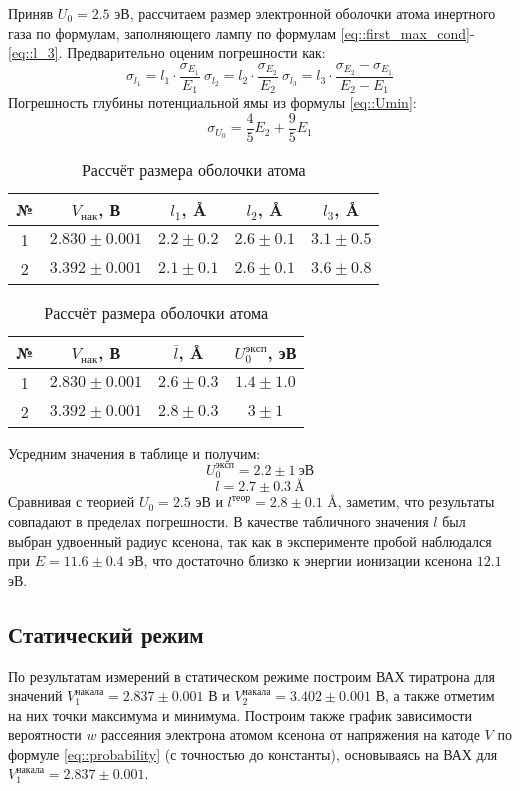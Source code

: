 Приняв $U_0 = 2.5$ эВ, рассчитаем размер электронной оболочки атома инертного
газа по формулам, заполняющего лампу по формулам
\eqref{eq::first_max_cond}-\eqref{eq::l_3}. Предварительно оценим погрешности
как:
\[
  \sigma_{l_1} = l_1 \cdot \frac{\sigma_{E_1}}{E_1} 
  \: 
  \sigma_{l_2} = l_2 \cdot \frac{\sigma_{E_2}}{E_2}
  \: 
  \sigma_{l_3} = l_3 \cdot \frac{\sigma_{E_2} - \sigma_{E_1}}{E_2 - E_1}
\]
Погрешность глубины потенциальной ямы из формулы \eqref{eq::Umin}:
\[
  \sigma_{U_0} = \frac{4}{5} E_2 + \frac{9}{5} E_1
\]
\begin{table}[h!]
  \centering
  \caption{Рассчёт размера оболочки атома}
  \begin{tabular}{|c|c|c|c|c|}
    \hline
    № & $V_{нак}$, В & $l_1$, \AA & $l_2$, \AA & $l_3$, \AA \\ 
    \hline
    1 & $2.830 \pm 0.001$ & $2.2 \pm 0.2$ & $ 2.6 \pm 0.1$ & $3.1 \pm 0.5$ \\ \hline
    2 & $3.392 \pm 0.001$ & $2.1 \pm 0.1$ & $ 2.6 \pm 0.1$ & $ 3.6 \pm 0.8$ \\ 
    \hline
  \end{tabular}
  \begin{tabular}{|c|c|c|c|}
    \hline
    № & $V_{нак}$, В & $\overline{l}$, \AA & $U_0^{эксп}$, эВ\\
    \hline
    1 & $2.830 \pm 0.001$ & $2.6 \pm 0.3$ & $ 1.4 \pm 1.0$\\\hline
    2 & $3.392 \pm 0.001$ & $2.8 \pm 0.3$ & $ 3 \pm 1$\\
    \hline
  \end{tabular}
\end{table}
Усредним значения в таблице и получим:
\[
  U_0^{эксп} = 2.2 \pm 1 \: \text{эВ}
\]
\[
  l = 2.7 \pm 0.3 \: \text{\AA}
\]
Сравнивая с теорией $U_0 = 2.5$ эВ и $l^{теор} = 2.8 \pm 0.1$ \AA, заметим, что
результаты совпадают в пределах погрешности. В качестве табличного значения $l$
был выбран удвоенный радиус ксенона, так как в эксперименте пробой наблюдался
при $E = 11.6 \pm 0.4$ эВ, что достаточно близко к энергии ионизации ксенона
$12.1$ эВ.

\subsection{Статический режим}

По результатам измерений в статическом режиме построим ВАХ тиратрона для
значений $V_1^{накала} = 2.837 \pm 0.001$ В и $V_2^{накала} = 3.402 \pm 0.001$
В, а также отметим на них точки максимума и минимума. Построим также график
зависимости вероятности $w$ рассеяния электрона атомом ксенона от напряжения на
катоде $V$ по формуле \eqref{eq::probability} (с точностью до константы), основываясь на ВАХ для $V_1^{накала} =
2.837 \pm 0.001$.

